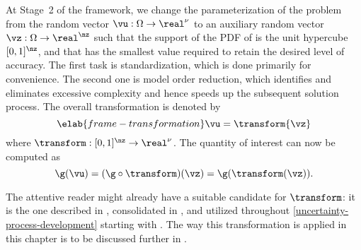At Stage~2 of the framework, we change the parameterization of the problem from
the random vector $\vu: \Omega \to \real^\nu$ to an auxiliary random vector
$\vz: \Omega \to \real^\nz$ such that the support of the \ac{PDF} of \vz is the
unit hypercube $[0, 1]^\nz$, and that \nz has the smallest value required to
retain the desired level of accuracy. The first task is standardization, which
is done primarily for convenience. The second one is model order reduction,
which identifies and eliminates excessive complexity and hence speeds up the
subsequent solution process. The overall transformation is denoted by
\begin{equation} \elab{frame-transformation}
  \vu = \transform{\vz}
\end{equation}
where $\transform: [0, 1]^\nz \to \real^\nu$. The quantity of interest \g can
now be computed as
\[
  \g(\vu) = (\g \circ \transform)(\vz) = \g(\transform(\vz)).
\]

The attentive reader might already have a suitable candidate for $\transform$:
it is the one described in , consolidated in
, and utilized throughout
\cref{uncertainty-process-development} starting with
. The way this transformation is applied in this
chapter is to be discussed further in .
